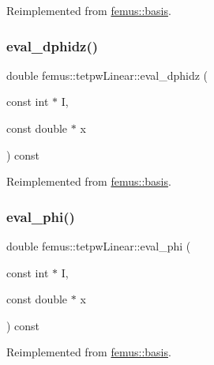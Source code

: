 Reimplemented from \mbox{\hyperlink{classfemus_1_1basis_a2819fac9aae797156b9efec8a0b85cc1}{femus\+::basis}}.

\mbox{\label{classfemus_1_1tetpw_linear_a6069f0d885dc151f2648b4ff587ef39f}} 
\subsubsection{\texorpdfstring{eval\+\_\+dphidz()}{eval\_dphidz()}}
{\footnotesize\ttfamily double femus\+::tetpw\+Linear\+::eval\+\_\+dphidz (\begin{DoxyParamCaption}\item[{const int $\ast$}]{I,  }\item[{const double $\ast$}]{x }\end{DoxyParamCaption}) const\hspace{0.3cm}{\ttfamily [virtual]}}



Reimplemented from \mbox{\hyperlink{classfemus_1_1basis_affd9927f6e25e264108219d862b8cb3d}{femus\+::basis}}.

\mbox{\label{classfemus_1_1tetpw_linear_aff13fdb969801b6c5e6cfc15ca67a957}} 
\subsubsection{\texorpdfstring{eval\+\_\+phi()}{eval\_phi()}}
{\footnotesize\ttfamily double femus\+::tetpw\+Linear\+::eval\+\_\+phi (\begin{DoxyParamCaption}\item[{const int $\ast$}]{I,  }\item[{const double $\ast$}]{x }\end{DoxyParamCaption}) const\hspace{0.3cm}{\ttfamily [virtual]}}



Reimplemented from \mbox{\hyperlink{classfemus_1_1basis_a89b0797cdccffae5ff6d059b32016ae5}{femus\+::basis}}.

\mbox{\label{classfemus_1_1tetpw_linear_a79576e1c49c1e056f3a869ba8e2a6a0a}} 
